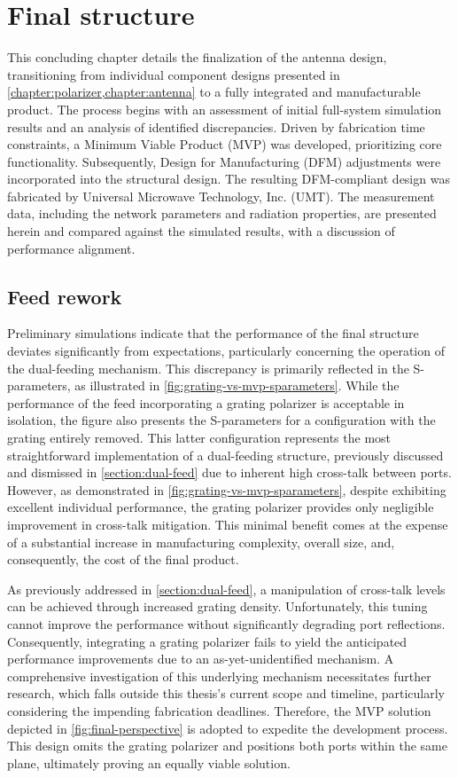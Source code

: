 \documentclass[11pt,a4paper,twoside,openany]{report}
\begin{document}
\chapter{Final structure}
\label{chapter:final-structure}
This concluding chapter details the finalization of the antenna design, transitioning from individual component designs presented in \cref{chapter:polarizer,chapter:antenna} to a fully integrated and manufacturable product. The process begins with an assessment of initial full-system simulation results and an analysis of identified discrepancies. Driven by fabrication time constraints, a Minimum Viable Product (MVP) was developed, prioritizing core functionality. Subsequently, Design for Manufacturing (DFM) adjustments were incorporated into the structural design. The resulting DFM-compliant design was fabricated by Universal Microwave Technology, Inc. (UMT). The measurement data, including the network parameters and radiation properties, are presented herein and compared against the simulated results, with a discussion of performance alignment.

\section{Feed rework}
Preliminary simulations indicate that the performance of the final structure deviates significantly from expectations, particularly concerning the operation of the dual-feeding mechanism. This discrepancy is primarily reflected in the S-parameters, as illustrated in \cref{fig:grating-vs-mvp-sparameters}. While the performance of the feed incorporating a grating polarizer is acceptable in isolation, the figure also presents the S-parameters for a configuration with the grating entirely removed. This latter configuration represents the most straightforward implementation of a dual-feeding structure, previously discussed and dismissed in \cref{section:dual-feed} due to inherent high cross-talk between ports. However, as demonstrated in \cref{fig:grating-vs-mvp-sparameters}, despite exhibiting excellent individual performance, the grating polarizer provides only negligible improvement in cross-talk mitigation. This minimal benefit comes at the expense of a substantial increase in manufacturing complexity, overall size, and, consequently, the cost of the final product.

As previously addressed in \cref{section:dual-feed}, a manipulation of cross-talk levels can be achieved through increased grating density. Unfortunately, this tuning cannot improve the performance without significantly degrading port reflections. Consequently, integrating a grating polarizer fails to yield the anticipated performance improvements due to an as-yet-unidentified mechanism. A comprehensive investigation of this underlying mechanism necessitates further research, which falls outside this thesis's current scope and timeline, particularly considering the impending fabrication deadlines. Therefore, the MVP solution depicted in \cref{fig:final-perspective} is adopted to expedite the development process. This design omits the grating polarizer and positions both ports within the same plane, ultimately proving an equally viable solution.
\end{document}
